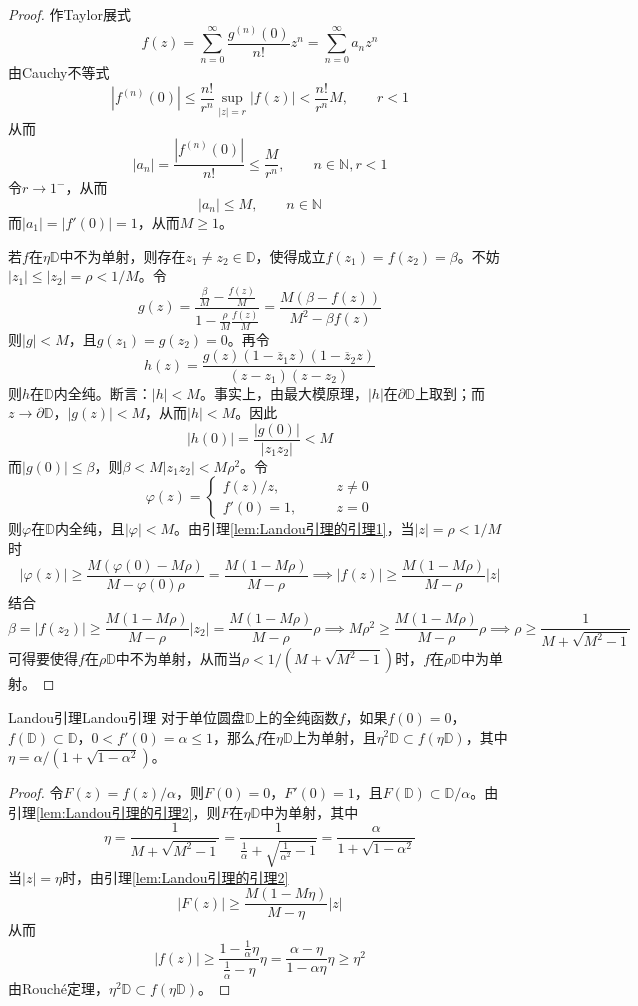 \documentclass[lang = cn, scheme = chinese, thmcnt = section]{elegantbook}
\newcommand{\N}{\mathbb{N}}            %
\newcommand{\sub}{\subset}             %
\begin{document}
\begin{proof}
	作Taylor展式%
	$$
	f(z)=\sum_{n=0}^{\infty}\frac{g^{(n)}(0)}{n!}z^n=\sum_{n=0}^{\infty}a_nz^n
	$$
	由Cauchy不等式%
	$$
	|f^{(n)}(0)| \le \frac{n!}{r^n}\sup_{|z|=r}|f(z)|
	< \frac{n!}{r^n}M,\qquad r<1
	$$
	从而%
	$$
	|a_n|=\frac{|f^{(n)}(0)|}{n!}\le\frac{M}{r^n},\qquad n\in\N,r<1
	$$
	令$r\to 1^-$，从而%
	$$
	|a_n|\le M,\qquad n\in\N
	$$
	而$|a_1|=|f'(0)|=1$，从而$M\ge 1$。
	
	若$f$在$\eta\mathbb{D}$中不为单射，则存在$z_1\ne z_2\in\mathbb{D}$，使得成立$f(z_1)=f(z_2)=\beta$。不妨$|z_1|\le |z_2|=\rho<1/M$。令%
	$$
	g(z)=\frac{\frac{\beta}{M}-\frac{f(z)}{M}}{1-\frac{\rho}{M}\frac{f(z)}{M}}
	=\frac{M(\beta-f(z))}{M^2-\beta f(z)}
	$$
	则$|g|<M$，且$g(z_1)=g(z_2)=0$。再令%
	$$
	h(z)=\frac{g(z)(1-\overline{z}_1z)(1-\overline{z}_2z)}{(z-z_1)(z-z_2)}
	$$
	则$h$在$\mathbb{D}$内全纯。断言：$|h|<M$。事实上，由最大模原理，$|h|$在$\partial\mathbb{D}$上取到；而$z\to\partial\mathbb{D}$，$|g(z)|<M$，从而$|h|<M$。因此
	$$
	|h(0)|=\frac{|g(0)|}{|z_1z_2|}<M
	$$
	而$|g(0)|\le \beta$，则$\beta<M|z_1z_2|<M\rho^2$。令%
	$$
	\varphi(z)=\begin{cases}
		f(z)/z,\qquad & z\ne 0\\
		f'(0)=1,\qquad & z=0
	\end{cases}
	$$
	则$\varphi$在$\mathbb{D}$内全纯，且$|\varphi|<M$。由引理\ref{lem:Landou引理的引理1}，当$|z|=\rho<1/M$时%
	$$
	|\varphi(z)|\ge\frac{M(\varphi(0)-M\rho)}{M-\varphi(0)\rho}
	=\frac{M(1-M\rho)}{M-\rho}\implies
	|f(z)|\ge\frac{M(1-M\rho)}{M-\rho}|z|
	$$
	结合%
	$$
	\beta=|f(z_2)|\ge\frac{M(1-M\rho)}{M-\rho}|z_2|
	=\frac{M(1-M\rho)}{M-\rho}\rho\implies
	M\rho^2\ge \frac{M(1-M\rho)}{M-\rho}\rho
	\implies
	\rho\ge\frac{1}{M+\sqrt{M^2-1}}
	$$
	可得要使得$f$在$\rho\mathbb{D}$中不为单射，从而当$\rho<1/(M+\sqrt{M^2-1})$时，$f$在$\rho\mathbb{D}$中为单射。
\end{proof}

\begin{theorem}{Landou引理}{Landou引理}
	对于单位圆盘$\mathbb{D}$上的全纯函数$f$，如果$f(0)=0$，$f(\mathbb{D})\sub\mathbb{D}$，$0<f'(0)=\alpha\le 1$，那么$f$在$\eta\mathbb{D}$上为单射，且$\eta^2\mathbb{D}\sub f\left(\eta\mathbb{D}\right)$，其中$\eta=\alpha/(1+\sqrt{1-\alpha^2})$。
\end{theorem}

\begin{proof}
	令$F(z)=f(z)/\alpha$，则$F(0)=0$，$F'(0)=1$，且$F(\mathbb{D})\sub\mathbb{D}/\alpha$。由引理\ref{lem:Landou引理的引理2}，则$F$在$\eta\mathbb{D}$中为单射，其中%
	$$
	\eta=\frac{1}{M+\sqrt{M^2-1}}
	=\frac{1}{\frac{1}{\alpha}+\sqrt{\frac{1}{\alpha^2}-1}}
	=\frac{\alpha}{1+\sqrt{1-\alpha^2}}
	$$
	当$|z|=\eta$时，由引理\ref{lem:Landou引理的引理2}%
	$$
	|F(z)|\ge\frac{M(1-M\eta)}{M-\eta}|z|
	$$
	从而%
	$$
	|f(z)|\ge\frac{1-\frac{1}{\alpha}\eta}{\frac{1}{\alpha}-\eta}\eta=\frac{\alpha-\eta}{1-\alpha\eta}\eta\ge\eta^2
	$$
	由Rouché定理，$\eta^2\mathbb{D}\sub f\left(\eta\mathbb{D}\right)$。
\end{proof}
\end{document}
